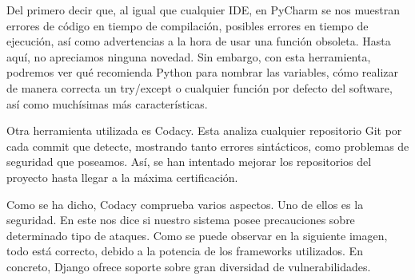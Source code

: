 Del primero decir que, al igual que cualquier IDE, en PyCharm se nos muestran errores de código en tiempo de compilación, posibles errores en tiempo de ejecución, así como advertencias a la hora de usar una función obsoleta. Hasta aquí, no apreciamos ninguna novedad. Sin embargo, con esta herramienta, podremos ver qué recomienda Python para nombrar las variables, cómo realizar de manera correcta un try/except o cualquier función por defecto del software, así como muchísimas más características.

Otra herramienta utilizada es Codacy. Esta analiza cualquier repositorio Git por cada commit que detecte, mostrando tanto errores sintácticos, como problemas de seguridad que poseamos. Así, se han intentado mejorar los repositorios del proyecto hasta llegar a la máxima certificación.

Como se ha dicho, Codacy comprueba varios aspectos. Uno de ellos es la seguridad. En este nos dice si nuestro sistema posee precauciones sobre determinado tipo de ataques. Como se puede observar en la siguiente imagen, todo está correcto, debido a la potencia de los frameworks utilizados. En concreto, Django ofrece soporte sobre gran diversidad de vulnerabilidades.

